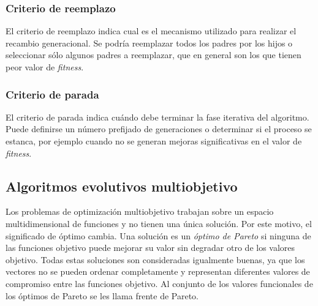 \subsubsection{Criterio de reemplazo} 
El criterio de reemplazo indica cual es el mecanismo utilizado para realizar el recambio generacional. Se podría reemplazar todos los padres por los hijos o seleccionar sólo algunos padres a reemplazar, que en general son los que tienen peor valor de \emph{fitness}.

\subsubsection{Criterio de parada} 
El criterio de parada indica cuándo debe terminar la fase iterativa del algoritmo. Puede definirse un número prefijado de generaciones o determinar si el proceso se estanca, por ejemplo cuando no se generan mejoras significativas en el valor de \emph{fitness}.



%
%


\subsection{Algoritmos evolutivos multiobjetivo}

Los problemas de optimización multiobjetivo trabajan sobre un espacio multidimensional de funciones y no tienen una única solución. Por este motivo, el significado de óptimo cambia. Una solución es un \emph{óptimo de Pareto} si ninguna de las funciones objetivo puede mejorar su valor sin degradar otro de los valores objetivo. Todas estas soluciones son consideradas igualmente buenas, ya que los vectores no se pueden ordenar completamente y representan diferentes valores de compromiso entre las funciones objetivo. Al conjunto de los valores funcionales de los óptimos de Pareto se les llama frente de Pareto.

